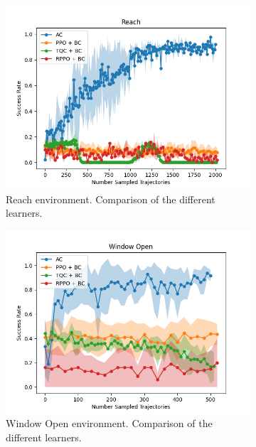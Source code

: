 \begin{figure}[htbp]
    \centering
    \begin{subfigure}[b]{0.45\textwidth}
      \includegraphics[width=\textwidth]{images/1_2000/Reach.png}
      \caption{Reach environment. Comparison of the different learners.}
      \label{fig:plot1}
    \end{subfigure}
    \hfill
    \begin{subfigure}[b]{0.45\textwidth}
      \includegraphics[width=\textwidth]{images/1_2000/Window Open.png}
      \caption{Window Open environment. Comparison of the different learners.}
      \label{fig:plot2}
    \end{subfigure}
    \medskip
    \begin{subfigure}[b]{0.45\textwidth}

\end{subfigure}
\end{figure}
